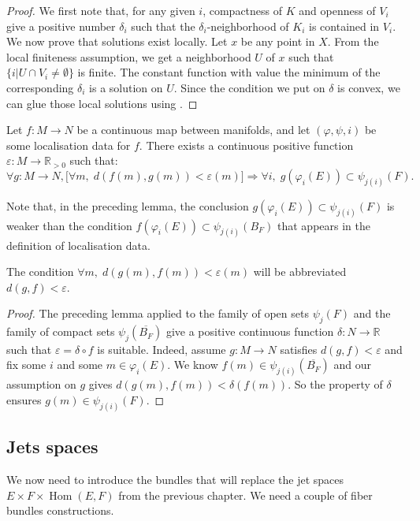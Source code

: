 \documentclass[10pt,a4paper]{article}
\newcounter{chapter}
\DeclareMathOperator{\Hom}{Hom}
\newcommand{\uses}[1]{}
\newcommand{\lean}[1]{}
\newcommand{\leanok}{}
\begin{document}
\begin{proof}
  \leanok
  We first note that, for any given $i$, compactness of $K$ and openness of
  $V_i$ give a positive number $δ_i$ such that the $δ_i$-neighborhood of $K_i$
  is contained in $V_i$. We now prove that solutions exist locally. Let $x$ be
  any point in $X$. From the local finiteness assumption, we get a neighborhood
  $U$ of $x$ such that $\{i | U ∩ V_i ≠ ∅\}$ is finite. The constant function
  with value the minimum of the corresponding $δ_i$ is a solution on $U$. Since
  the condition we put on $δ$ is convex, we can glue those local solutions using
  .
\end{proof}

\begin{lemma}
  \label{lem:localisation_stability}
  \lean{localisation_stability}
  \leanok
  \uses{def:localisation_data}
  Let $f : M → N$ be a continuous map between manifolds, and let
  $(φ, ψ, i)$ be some localisation data for $f$. There exists a continuous
  positive function $ε : M → ℝ_{>0}$ such that:
  \[
    ∀ g : M → N, \big[∀ m,\; d(f(m), g(m)) < ε(m)\big] ⇒ ∀ i,\; g(φ_i(E)) ⊂ ψ_{j(i)}(F).
  \]
\end{lemma}
Note that, in the preceding lemma, the conclusion $g(φ_i(E)) ⊂ ψ_{j(i)}(F)$ is
weaker than the condition $f(φ_i(E)) ⊂ ψ_{j(i)}(B_F)$ that appears in the
definition of localisation data.

The condition $∀ m,\; d(g(m), f(m)) < ε(m)$ will be abbreviated $d(g, f) < ε$.

\begin{proof}
  \leanok
  \uses{lem:stability_cover}
  The preceding lemma applied to the family of open sets $ψ_j(F)$ and the
  family of compact sets $ψ_j(\overline{B_F})$ give a positive continuous
  function $δ : N → ℝ$ such that $ε = δ ∘ f$ is suitable. Indeed, assume
  $g : M → N$ satisfies $d(g, f) < ε$ and fix some $i$ and some $m ∈ φ_i(E)$.
  We know $f(m) ∈ ψ_{j(i)}(\overline{B_F})$ and our assumption on $g$ gives
  $d(g(m), f(m)) < δ(f(m))$. So the property of $δ$ ensures $g(m) ∈ ψ_{j(i)}(F)$.
\end{proof}


\subsection{Jets spaces}

We now need to introduce the bundles that will replace the jet spaces
$E × F × \Hom(E, F)$ from the previous chapter. We need a couple of
fiber bundles constructions.
\end{document}
